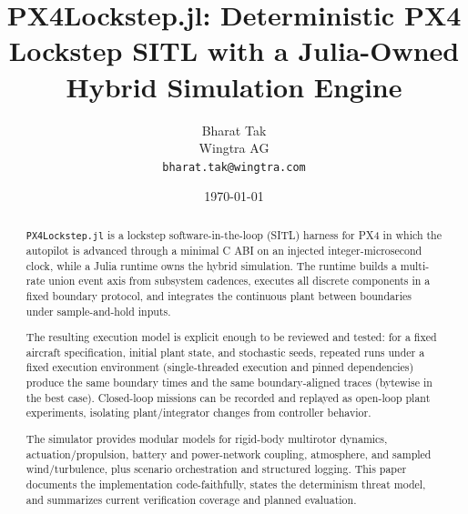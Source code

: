 \documentclass[11pt]{article}
\title{PX4Lockstep.jl: Deterministic PX4 Lockstep SITL with a Julia-Owned Hybrid Simulation Engine}
\author{Bharat Tak\\Wingtra AG\\\texttt{bharat.tak@wingtra.com}}
\date{\today}
\newcommand{\code}[1]{\nolinkurl{#1}}
\begin{document}
\maketitle

\begin{abstract}
\noindent
\code{PX4Lockstep.jl} is a lockstep software-in-the-loop (SITL) harness for PX4 in which the autopilot is advanced through a minimal C ABI on an injected integer-microsecond clock, while a Julia runtime owns the hybrid simulation. The runtime builds a multi-rate union event axis from subsystem cadences, executes all discrete components in a fixed boundary protocol, and integrates the continuous plant between boundaries under sample-and-hold inputs.

The resulting execution model is explicit enough to be reviewed and tested: for a fixed aircraft specification, initial plant state, and stochastic seeds, repeated runs under a fixed execution environment (single-threaded execution and pinned dependencies) produce the same boundary times and the same boundary-aligned traces (bytewise in the best case). Closed-loop missions can be recorded and replayed as open-loop plant experiments, isolating plant/integrator changes from controller behavior.

The simulator provides modular models for rigid-body multirotor dynamics, actuation/propulsion, battery and power-network coupling, atmosphere, and sampled wind/turbulence, plus scenario orchestration and structured logging. This paper documents the implementation code-faithfully, states the determinism threat model, and summarizes current verification coverage and planned evaluation.
\end{abstract}


\clearpage

\clearpage
\renewcommand{\contentsname}{Table of Contents}
\tableofcontents
\clearpage





















\appendix



\end{document}
